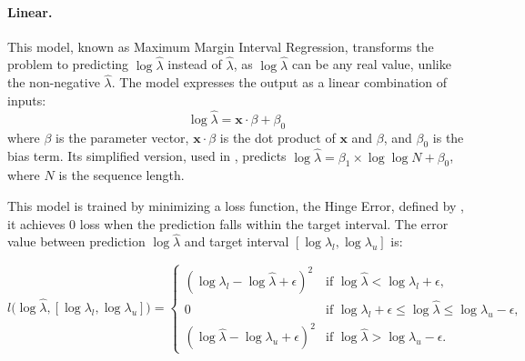 \documentclass[12pt]{article}
\begin{document}
\paragraph{Linear.} This model, known as Maximum Margin Interval Regression, transforms the problem to predicting $\log \hat{\lambda}$ instead of $\hat{\lambda}$, as $\log \hat{\lambda}$ can be any real value, unlike the non-negative $\hat{\lambda}$. The model expresses the output as a linear combination of inputs:
\begin{equation}
    \log \hat{\lambda} = \mathbf{x} \cdot \beta + \beta_0
\end{equation}
where $\beta$ is the parameter vector, $\mathbf{x} \cdot \beta$ is the dot product of $\mathbf{x}$ and $\beta$, and $\beta_0$ is the bias term.
Its simplified version, used in \cite{lopart}, predicts $\log \hat{\lambda} = \beta_1 \times \log \log N + \beta_0$, where $N$ is the sequence length.

This model is trained by minimizing a loss function, the Hinge Error, defined by \citet{rigaill:13}, it achieves 0 loss when the prediction falls within the target interval.
The error value between prediction $\log \hat{\lambda}$ and target interval $[\log \lambda_l, \log \lambda_u]$ is: 

$$l\Big(\log \hat{\lambda}, [\log \lambda_l, \log \lambda_u]\Big) = 
\begin{cases} 
    (\log \lambda_l - \log \hat{\lambda} + \epsilon)^2 & \mbox{if } \log \hat{\lambda} < \log \lambda_l + \epsilon, \\
    0 & \mbox{if } \log \lambda_l + \epsilon \leq \log \hat{\lambda} \leq \log \lambda_u - \epsilon, \\
    (\log \hat{\lambda} - \log \lambda_u + \epsilon)^2 & \mbox{if } \log \hat{\lambda} > \log \lambda_u - \epsilon.
\end{cases}$$
\end{document}
